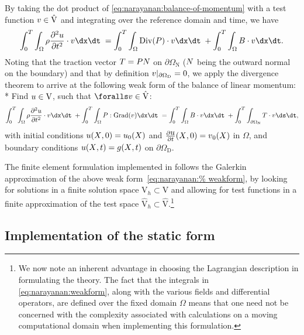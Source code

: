 By taking the dot product of \eqref{eq:narayanan:balance-of-momentum}
with a test function $\mbox{$ v$} \in \hat{\mathrm{V}}$ and integrating over
the reference domain and time, we have
\begin{equation}
  \int_{0}^{T} \int_{\Omega} \rho \frac{\partial^{2}
    \bu}{\partial t^{2}} \cdot \bv \dx \dt\;
  = \int_{0}^{T}\int_{\Omega} \mathrm{Div}(\bP) \cdot \bv \dx \dt\;
  + \int_{0}^{T} \int_{\Omega} \bB \cdot \bv \dx \dt.
\end{equation}
Noting that the traction vector $\mbox{$ T$} = \mbox{$ P$} \mbox{$ N$}$ on
$\partial\Omega_{\mathrm{N}}$ ($\mbox{$ N$}$ being the outward normal on the
boundary) and that by definition $\mbox{$ v$}|_{\partial\Omega_{\mathrm{D}}} =
0$, we apply the divergence theorem to arrive at the following weak
form of the balance of linear momentum: \\*
Find $\mbox{$ u$} \in \mathrm{V}$, such that $\foralls \bv \in
\hat{\mathrm{V}}$:
\begin{equation}
  \int_{0}^{T} \int_{\Omega} \rho \frac{\partial^{2} \bu}{\partial
    t^{2}} \cdot \bv \dx \dt\; + \int_{0}^{T} \int_{\Omega}
  \bP:\mathrm{Grad}(\bv) \dx \dt\; = \int_{0}^{T} \int_{\Omega} \bB
  \cdot \bv \dx \dt\; + \int_{0}^{T} \int_{\partial\Omega_{\mathrm{N}}}
  \bT \cdot \bv \ds \dt,
\label{eq:narayanan:weakform}
\end{equation}
with initial conditions $\mbox{$ u$}(\mbox{$ X$}, 0) = \mbox{$ u$}_{0}(\mbox{$ X$})$ and
$\frac{\partial\mbox{$ u$}}{\partial t}(\mbox{$ X$}, 0) = \mbox{$ v$}_{0}(\mbox{$ X$})$ in $\Omega$,
and boundary conditions $\mbox{$ u$}(\mbox{$ X$}, t) = \mbox{$ g$}(\mbox{$ X$}, t)$ on
$\partial\Omega_{\mathrm{D}}$.

The finite element formulation implemented in \twist{} follows the
Galerkin approximation of the above weak form~\eqref{eq:narayanan:%
weakform}, by looking for solutions in a finite solution space
$\mathrm{V}_{h} \subset \mathrm{V}$ and allowing for test functions in
a finite approximation of the test space $\hat{\mathrm{V}}_{h} \subset
\hat{\mathrm{V}}$.\footnote{We now note an inherent advantage in
  choosing the Lagrangian description in formulating the theory. The
  fact that the integrals in \eqref{eq:narayanan:weakform}, along with
  the various fields and differential operators, are defined over the
  fixed domain $\Omega$ means that one need not be concerned with the
  complexity associated with calculations on a moving computational
  domain when implementing this formulation.}

\subsection{Implementation of the static form}


